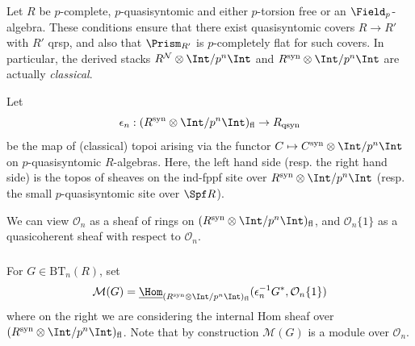 \documentclass[10pt]{amsart}
\begin{document}
\subsubsection{}
Let $R$ be $p$-complete, $p$-quasisyntomic and either $p$-torsion free or an $\Field_p$-algebra. These conditions ensure that there exist quasisyntomic covers $R\to R'$ with $R'$ qrsp, and also that $\Prism_{R'}$ is $p$-completely flat for such covers. In particular, the derived stacks $R^{\mathcal{N}}\otimes\Int/p^n\Int$ and $R^{\mathrm{syn}}\otimes\Int/p^n\Int$ are actually \emph{classical}.

Let
\[
\epsilon_n:(R^{\mathrm{syn}}\otimes\Int/p^n\Int)_{\mathrm{fl}}\to R_{\mathrm{qsyn}}
\]
be the map of (classical) topoi arising via the functor $C\mapsto C^{\mathrm{syn}}\otimes\Int/p^n\Int$ on $p$-quasisyntomic $R$-algebras. Here, the left hand side (resp. the right hand side) is the topos of sheaves on the ind-fppf site over $R^{\mathrm{syn}}\otimes\Int/p^n\Int$ (resp. the small $p$-quasisyntomic site over $\Spf R$).

We can view $\mathcal{O}_n$ as a sheaf of rings on $(R^{\mathrm{syn}}\otimes\Int/p^n\Int)_{\mathrm{fl}}$, and $\mathcal{O}_n\{1\}$ as a quasicoherent sheaf with respect to $\mathcal{O}_n$.

\subsubsection{}
For $G\in \mathrm{BT}_n(R)$, set
\[
\mathcal{M}(G) = \underline{\Hom}_{(R^{\mathrm{syn}}\otimes\Int/p^n\Int)_{\mathrm{fl}}}(\epsilon_n^{-1}G^*,\mathcal{O}_n\{1\})
\]
where on the right we are considering the internal Hom sheaf over $(R^{\mathrm{syn}}\otimes\Int/p^n\Int)_{\mathrm{fl}}$. Note that by construction $\mathcal{M}(G)$ is a module over $\mathcal{O}_n$.
\end{document}
